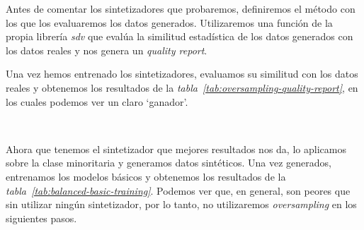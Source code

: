 Antes de comentar los sintetizadores que probaremos, definiremos el método con los que los evaluaremos los datos generados. Utilizaremos una función de la propia librería \textit{sdv} que evalúa la similitud estadística de los datos generados con los datos reales y nos genera un \textit{quality report}.

Una vez hemos entrenado los sintetizadores, evaluamos su similitud con los datos reales y obtenemos los resultados de la \textit{tabla\ \ref{tab:oversampling-quality-report}}, en los cuales podemos ver un claro `ganador'.

\begin{table}[!ht]
    \centering
    \caption{Resultados del \textit{quality report} de los datos generados con los sintetizadores. Fuente propia}\ \label{tab:oversampling-quality-report}
\end{table}

Ahora que tenemos el sintetizador que mejores resultados nos da, lo aplicamos sobre la clase minoritaria y generamos datos sintéticos. Una vez generados, entrenamos los modelos básicos y obtenemos los resultados de la \textit{tabla\ \ref{tab:balanced-basic-training}}. Podemos ver que, en general, son peores que sin utilizar ningún sintetizador, por lo tanto, no utilizaremos \textit{oversampling} en los siguientes pasos.


